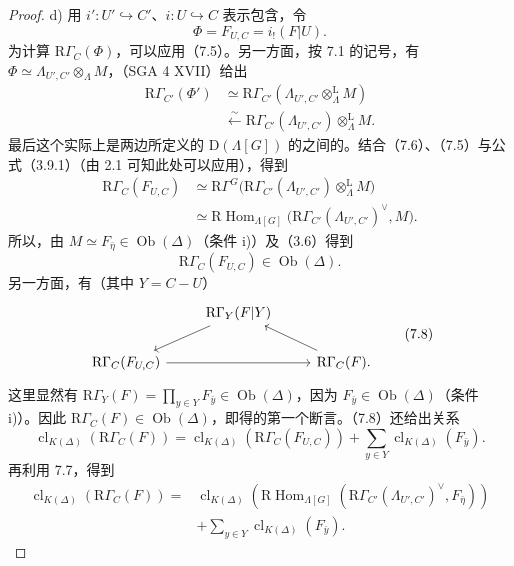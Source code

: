 \begin{proof}
d) 用 $i':U'\hookrightarrow C'$、$i:U\hookrightarrow C$ 表示包含，令
\[
\Phi=F_{U,C}=i_!(F|U).
\]
为计算 $\mathrm R\Gamma_C(\Phi)$，可以应用（7.5）。另一方面，按 7.1 的记号，有 $\Phi\simeq\Lambda_{U',C'}\otimes_\Lambda M$，（SGA 4 XVII）给出
\[
\begin{aligned}
\mathrm R\Gamma_{C'}(\Phi')
&\simeq\mathrm R\Gamma_{C'}(\Lambda_{U',C'}\otimes_\Lambda^{\mathrm L}M)\\
&\xleftarrow{\sim}\mathrm R\Gamma_{C'}(\Lambda_{U',C'})\otimes_\Lambda^{\mathrm L}M.
\end{aligned}\tag{7.6}
\]
最后这个实际上是两边所定义的 $\mathrm D(\Lambda[G])$ 的之间的。结合（7.6）、（7.5）与公式（3.9.1）（由 2.1 可知此处可以应用），得到
\[
\begin{aligned}
\mathrm R\Gamma_C(F_{U,C})
&\simeq\mathrm R\Gamma^G\bigl(\mathrm R\Gamma_{C'}(\Lambda_{U',C'})\otimes_\Lambda^{\mathrm L}M\bigr)\\
&\simeq\mathrm R\operatorname{Hom}_{\Lambda[G]}
\bigl(\mathrm R\Gamma_{C'}(\Lambda_{U',C'})^\vee,M\bigr).
\end{aligned}\tag{7.7}
\]
所以，由 $M\simeq F_{\bar\eta}\in\operatorname{Ob}(\Delta)$（条件 i)）及（3.6）得到
\[
\mathrm R\Gamma_C(F_{U,C})\in\operatorname{Ob}(\Delta).
\]
另一方面，有（其中 $Y=C-U$）
\[
\begin{tikzcd}
&\mathrm R\Gamma_Y(F|Y)\arrow[dl]&\\
\mathrm R\Gamma_C(F_{U,C})\arrow[rr]&&\mathrm R\Gamma_C(F)\arrow[ul].
\end{tikzcd}\tag{7.8}
\]
这里显然有 $\mathrm R\Gamma_Y(F)=\prod_{y\in Y}F_{\bar y}\in\operatorname{Ob}(\Delta)$，因为 $F_{\bar y}\in\operatorname{Ob}(\Delta)$（条件 i)）。因此 $\mathrm R\Gamma_C(F)\in\operatorname{Ob}(\Delta)$，即得的第一个断言。（7.8）还给出关系
\[
\operatorname{cl}_{K(\Delta)}(\mathrm R\Gamma_C(F))
=\operatorname{cl}_{K(\Delta)}(\mathrm R\Gamma_C(F_{U,C}))
+\sum_{y\in Y}\operatorname{cl}_{K(\Delta)}(F_{\bar y}).
\]
再利用 7.7，得到
\[
\begin{aligned}
\operatorname{cl}_{K(\Delta)}(\mathrm R\Gamma_C(F))
={}&\operatorname{cl}_{K(\Delta)}\!\left(\mathrm R\operatorname{Hom}_{\Lambda[G]}
(\mathrm R\Gamma_{C'}(\Lambda_{U',C'})^\vee,F_{\bar\eta})\right)\\
&+\sum_{y\in Y}\operatorname{cl}_{K(\Delta)}(F_{\bar y}).

\end{aligned}\]
\end{proof}
